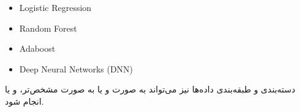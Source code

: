 \begin{LTR}
    \begin{itemize}
        \item Logistic Regression
        \item Random Forest
        \item Adaboost
        \item Deep Neural Networks (DNN)
    \end{itemize}
\end{LTR}

دسته‌بندی و طبقه‌بندی داده‌ها نیز می‌تواند به صورت  و  یا
به صورت مشخص‌تر،  و یا  انجام شود.